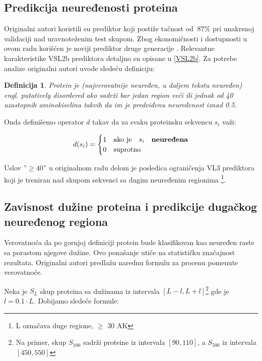 \subsection{Predikcija neuređenosti proteina}
\label{naredno}

Originalni autori koristili su  prediktor koji
postiže tačnost od $~87\%$ pri unakrsnoj validaciji nad uravnoteženim test
skupom.  Zbog ekonomičnosti i dostupnosti u ovom radu korišćen je noviji
prediktor druge generacije .
Relevantne karakteristike VSL2b prediktora detaljno su opisane u \ref{VSL2b}.
Za potrebe analize originalni autori  uvode sledeću definiciju:

\newtheorem{mydef}{Definicija}
\begin{mydef}
\label{pdis_def}
Protein je  (najverovatnije neuređen, u daljem tekstu neuređen) engl. putatively disordered
ako sadrži bar jedan region veći ili jednak od 40 uzastopnih aminokiselina
takvih da im je predviđenu neuređenost iznad 0.5. 
\end{mydef}

Onda definišemo operator $d$ takav da za svaku proteinsku sekvencu $s_i$ važi:

\[   
  d(s_i) = 
    \begin{cases}
      1 & \text{ako je} \quad s_i \quad \textbf{neuređena}\\
      0 & \text{suprotno}
    \end{cases}
\]

Uslov ''$\ge40$'' u originalnom radu delom je posledica ograničenja VL3
prediktora koji je treniran nad skupom sekvenci sa dugim neuređenim regionima
\footnote{L označava duge regione, $\ge$ 30 AK}.

\subsection{Zavisnost dužine proteina i predikcije dugačkog neuređenog regiona}

Verovatnoća da po gornjoj definiciji protein bude klasifikovan kao neuređen
raste sa porastom njegove dužine. Ovo ponašanje  utiče na statističku
značajnost rezultata.  Originalni autori predlažu narednu formulu za procenu
pomenute verovatnoće.

Neka je $S_L$ skup proteina sa dužinama iz intervala $[L-l, L+l]$\footnote{Na
primer, skup $S_{100}$ sadrži proteine iz intervala $[90, 110]$, a $S_{500}$ iz
intervala $[450, 550]$} gde je $l = 0.1 \cdot L$. Dobijamo sledeće formule:

